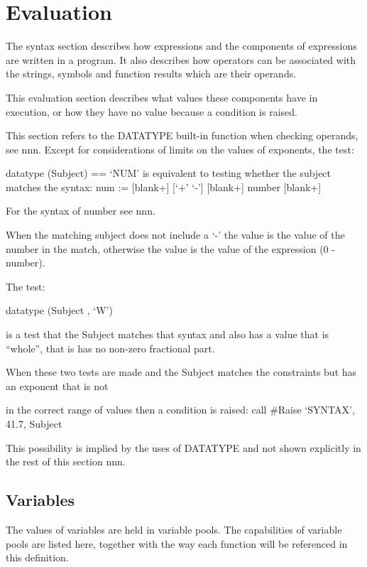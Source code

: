 \hypertarget{evaluation}{%
\chapter{Evaluation}\label{evaluation}}

The syntax section describes how expressions and the components of
expressions are written in a program. It also describes how operators
can be associated with the strings, symbols and function results which
are their operands.

This evaluation section describes what values these components have in
execution, or how they have no value because a condition is raised.

This section refers to the DATATYPE built-in function when checking
operands, see nnn. Except for considerations of limits on the values of
exponents, the test:

datatype (Subject) == `NUM' is equivalent to testing whether the subject
matches the syntax: num := {[}blank+{]} {[}`+' \textbar{} `-'{]}
{[}blank+{]} number {[}blank+{]}

For the syntax of number see nnn.

When the matching subject does not include a `-' the value is the value
of the number in the match, otherwise the value is the value of the
expression (0 - number).

The test:

datatype (Subject , `W')

is a test that the Subject matches that syntax and also has a value that
is ``whole'', that is has no non-zero fractional part.

When these two tests are made and the Subject matches the constraints
but has an exponent that is not

in the correct range of values then a condition is raised: call \#Raise
`SYNTAX', 41.7, Subject

This possibility is implied by the uses of DATATYPE and not shown
explicitly in the rest of this section nnn.

\hypertarget{variables}{%
\section{Variables}\label{variables}}

The values of variables are held in variable pools. The capabilities of
variable pools are listed here, together with the way each function will
be referenced in this definition.

